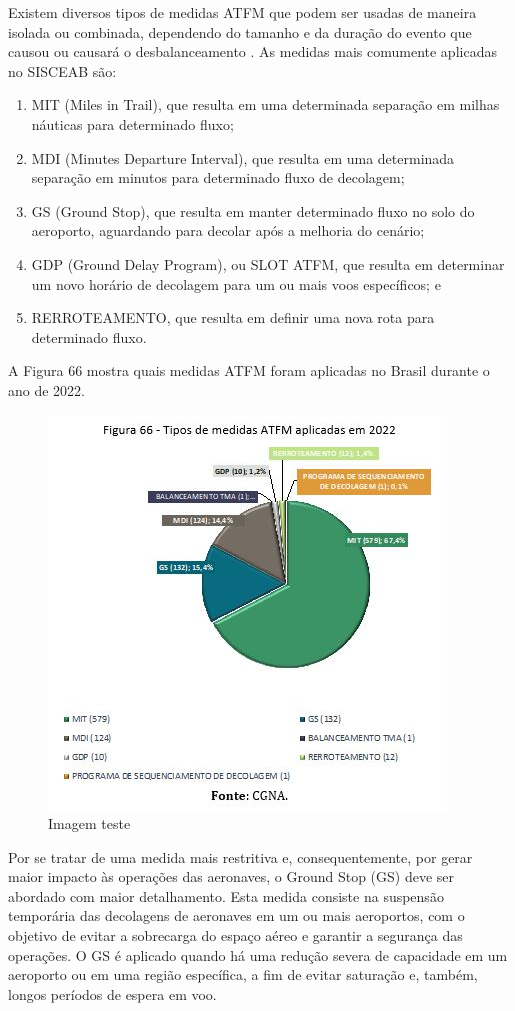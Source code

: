 \documentclass[
]{book}
\begin{document}
Existem diversos tipos de medidas ATFM que podem ser usadas de maneira isolada ou combinada, dependendo do tamanho e da duração do evento que causou ou causará o desbalanceamento . As medidas mais comumente aplicadas no SISCEAB são:

\begin{enumerate}
\def\labelenumi{\alph{enumi})}
\item
  MIT (Miles in Trail), que resulta em uma determinada separação em milhas náuticas para determinado fluxo;
\item
  MDI (Minutes Departure Interval), que resulta em uma determinada separação em minutos para determinado fluxo de decolagem;
\item
  GS (Ground Stop), que resulta em manter determinado fluxo no solo do aeroporto, aguardando para decolar após a melhoria do cenário;
\item
  GDP (Ground Delay Program), ou SLOT ATFM, que resulta em determinar um novo horário de decolagem para um ou mais voos específicos; e
\item
  RERROTEAMENTO, que resulta em definir uma nova rota para determinado fluxo.
\end{enumerate}

A Figura 66 mostra quais medidas ATFM foram aplicadas no Brasil durante o ano de 2022.

\begin{figure}
\centering
\includegraphics{imagens/fig55.jpg}
\caption{Imagem teste}
\end{figure}

Por se tratar de uma medida mais restritiva e, consequentemente, por gerar maior impacto às operações das aeronaves, o Ground Stop (GS) deve ser abordado com maior detalhamento. Esta medida consiste na suspensão temporária das decolagens de aeronaves em um ou mais aeroportos, com o objetivo de evitar a sobrecarga do espaço aéreo e garantir a segurança das operações. O GS é aplicado quando há uma redução severa de capacidade em um aeroporto ou em uma região específica, a fim de evitar saturação e, também, longos períodos de espera em voo.
\end{document}
